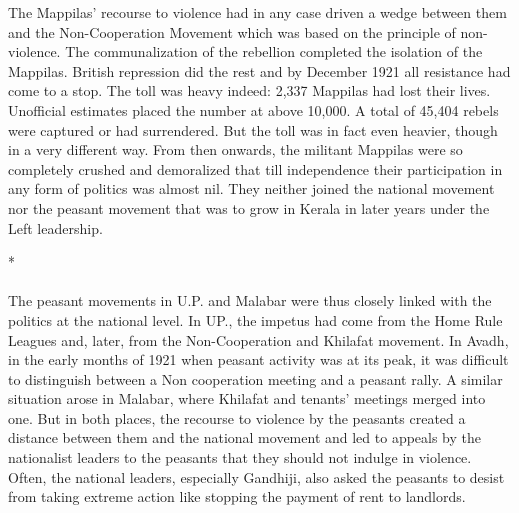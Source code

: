 \begin{multicols}{2}
The Mappilas' recourse to violence had in any case driven a wedge between them and the Non-Cooperation Movement which was based on the principle of non-violence. The communalization of the rebellion completed the isolation of the Mappilas. British repression did the rest and by December 1921 all resistance had come to a stop. The toll was heavy indeed: 2,337 Mappilas had lost their lives. Unofficial estimates placed the number at above 10,000. A total of 45,404 rebels were captured or had surrendered. But the toll was in fact even heavier, though in a very different way. From then onwards, the militant Mappilas were so completely crushed and demoralized that till independence their participation in any form of politics was almost nil. They neither joined the national movement nor the peasant movement that was to grow in Kerala in later years under the Left leadership.

\begin{center}*\end{center}

\paragraph*{}

The peasant movements in U.P. and Malabar were thus closely linked with the politics at the national level. In UP., the impetus had come from the Home Rule Leagues and, later, from the Non-Cooperation and Khilafat movement. In Avadh, in the early months of 1921 when peasant activity was at its peak, it was difficult to distinguish between a Non cooperation meeting and a peasant rally. A similar situation arose in Malabar, where Khilafat and tenants' meetings merged into one. But in both places, the recourse to violence by the peasants created a distance between them and the national movement and led to appeals by the nationalist leaders to the peasants that they should not indulge in violence. Often, the national leaders, especially Gandhiji, also asked the peasants to desist from taking extreme action like stopping the payment of rent to landlords.


\end{multicols}

